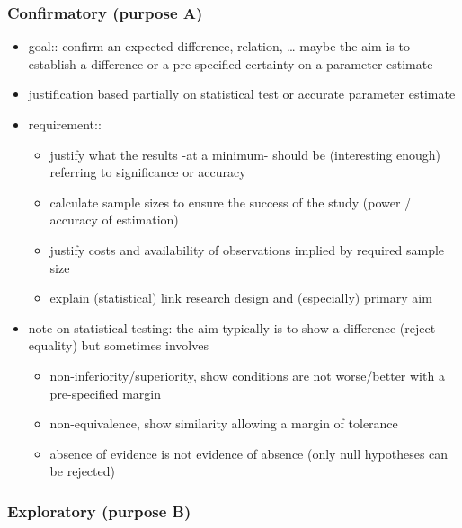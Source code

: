 \documentclass[]{article}
\providecommand{\tightlist}{%
  \setlength{\itemsep}{0pt}\setlength{\parskip}{0pt}}
\begin{document}
\subsubsection{Confirmatory (purpose A)}\label{confirmatory-purpose-a}

\begin{itemize}
\tightlist
\item
  goal:: confirm an expected difference, relation, \ldots{} maybe the
  aim is to establish a difference or a pre-specified certainty on a
  parameter estimate
\item
  justification based partially on statistical test or accurate
  parameter estimate
\item
  requirement::

  \begin{itemize}
  \tightlist
  \item
    justify what the results -at a minimum- should be (interesting
    enough) referring to significance or accuracy
  \item
    calculate sample sizes to ensure the success of the study (power /
    accuracy of estimation)
  \item
    justify costs and availability of observations implied by required
    sample size
  \item
    explain (statistical) link research design and (especially) primary
    aim 
  \end{itemize}
\item
  note on statistical testing: the aim typically is to show a difference
  (reject equality) but sometimes involves

  \begin{itemize}
  \tightlist
  \item
    non-inferiority/superiority, show conditions are not worse/better
    with a pre-specified margin
  \item
    non-equivalence, show similarity allowing a margin of tolerance
  \item
    absence of evidence is not evidence of absence (only null hypotheses
    can be rejected)
  \end{itemize}
\end{itemize}

\subsubsection{Exploratory (purpose B)}\label{exploratory-purpose-b}
\end{document}
